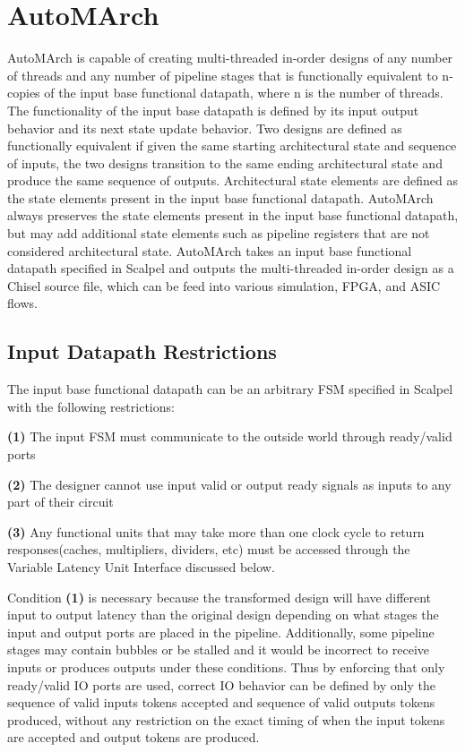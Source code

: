 \section{AutoMArch}
AutoMArch is capable of creating multi-threaded in-order designs of any number of threads and any number of pipeline stages that is functionally equivalent to n-copies of the input base functional datapath, where n is the number of threads. The functionality of the input base datapath is defined by its input output behavior and its next state update behavior. Two designs are defined as functionally equivalent if given the same starting architectural state and sequence of inputs, the two designs transition to the same ending architectural state and produce the same sequence of outputs. Architectural state elements are defined as the state elements present in the input base functional datapath. AutoMArch always preserves the state elements present in the input base functional datapath, but may add additional state elements such as pipeline registers that are not considered architectural state. AutoMArch takes an input base functional datapath specified in Scalpel and outputs the multi-threaded in-order design as a Chisel source file, which can be feed into various simulation, FPGA, and ASIC flows.

\subsection{Input Datapath Restrictions}
\label{section:InputRestrictions}
The input base functional datapath can be an arbitrary FSM specified in Scalpel with the following restrictions:

{\bf (1)} The input FSM must communicate to the outside world through ready/valid ports  

{\bf (2)} The designer cannot use input valid or output ready signals as inputs to any part of their circuit

{\bf (3)} Any functional units that may take more than one clock cycle to return responses(caches, multipliers, dividers, etc) must be accessed through the Variable Latency Unit Interface discussed below.

Condition {\bf (1)} is necessary because the transformed design will have different input to output latency than the original design depending on what stages the input and output ports are placed in the pipeline. Additionally, some pipeline stages may contain bubbles or be stalled and it would be incorrect to receive inputs or produces outputs under these conditions. Thus by enforcing that only ready/valid IO ports are used, correct IO behavior can be defined by only the sequence of valid inputs tokens accepted and sequence of valid outputs tokens produced, without any restriction on the exact timing of when the input tokens are accepted and output tokens are produced.

